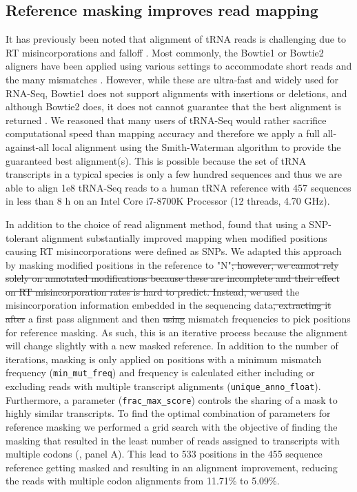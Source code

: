 \documentclass[9pt,lineno]{elife}
\newcommand{\KDdel}[1]{\sout{#1}}
\newcommand{\KDadd}[1]{\textbf{\color{red}{#1}}}
\begin{document}
 

\subsection{Reference masking improves read mapping}
It has previously been noted that alignment of tRNA reads is challenging due to RT misincorporations and falloff \citep{Hoffmann2018-uz, Behrens2021-gb}.
Most commonly, the Bowtie1 or Bowtie2 aligners have been applied using various settings to accommodate short reads and the many mismatches \citep{Cozen2015-cx, Zheng2015-kj, Clark2016-ph, Evans2017-st, Pinkard2020-yd}.
However, while these are ultra-fast and widely used for RNA-Seq, Bowtie1 does not support alignments with insertions or deletions, and although Bowtie2 does, it does not cannot guarantee that the best alignment is returned \citep{Langmead2009-yx, Langmead2012-ui}.
We reasoned that many users of tRNA-Seq would rather sacrifice computational speed than mapping accuracy and therefore we apply a full all-against-all local alignment using the Smith-Waterman algorithm to provide the guaranteed best alignment(s).
This is possible because the set of tRNA transcripts in a typical species is only a few hundred sequences and thus we are able to align 1e8 tRNA-Seq reads to a human tRNA reference with 457 sequences in less than 8 h on an Intel Core i7-8700K Processor (12 threads, 4.70 GHz).

In addition to the choice of read alignment method, \cite{Behrens2021-gb} found that using a SNP-tolerant alignment substantially improved mapping when modified positions causing RT misincorporations were defined as SNPs\KDadd{ and that new modifications could be inferred from the data}.
We adapted this approach by masking modified positions in the reference to "N"\KDdel{; however, we cannot rely solely on annotated modifications because these are incomplete and their effect on RT misincorporation rates is hard to predict. Instead, we used}\KDadd{ while relying solely on} the misincorporation information embedded in the sequencing data\KDdel{, extracting it after}\KDadd{. We extracted this information using} a first pass alignment and then \KDdel{using}\KDadd{used} mismatch frequencies to pick positions for reference masking.
As such, this is an iterative process because the alignment will change slightly with a new masked reference.
In addition to the number of iterations, masking is only applied on positions with a minimum mismatch frequency (\verb|min_mut_freq|) and frequency is calculated either including or excluding reads with multiple transcript alignments (\verb|unique_anno_float|).
Furthermore, a parameter (\verb|frac_max_score|) controls the sharing of a mask to  highly similar transcripts.
To find the optimal combination of parameters for reference masking we performed a grid search with the objective of finding the masking that resulted in the least number of reads assigned to transcripts with multiple codons (, panel A).
This lead to 533 positions in the 455 sequence reference getting masked and resulting in an alignment improvement, reducing the reads with multiple codon alignments from 11.71\% to 5.09\%.
\end{document}
